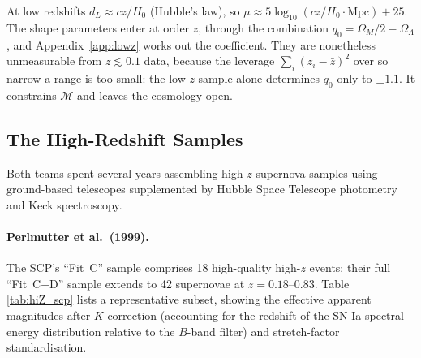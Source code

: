 \documentclass[12pt]{article}
\begin{document}
At low redshifts $d_L \approx cz/H_0$ (Hubble's law), so
$\mu \approx 5\log_{10}(cz/H_0\cdot\text{Mpc}) + 25$.  The shape parameters
enter at order $z$, through the combination $q_0 = \Omega_M/2 -
\Omega_\Lambda$, and Appendix~\ref{app:lowz} works out the coefficient.  They
are nonetheless unmeasurable from $z \lesssim 0.1$ data, because the leverage
$\sum_i(z_i-\bar z)^2$ over so narrow a range is too small: the low-$z$ sample
alone determines $q_0$ only to $\pm 1.1$.  It constrains $\mathcal{M}$ and
leaves the cosmology open.

\subsection{The High-Redshift Samples}

Both teams spent several years assembling high-$z$ supernova samples
using ground-based telescopes supplemented by Hubble Space Telescope
photometry and Keck spectroscopy.

\paragraph{Perlmutter et al.\ (1999).}  The SCP's ``Fit~C'' sample
comprises 18 high-quality high-$z$ events; their full ``Fit~C+D''
sample extends to 42 supernovae at $z = 0.18$--$0.83$.  Table
\ref{tab:hiZ_scp} lists a representative subset, showing the effective
apparent magnitudes after $K$-correction (accounting for the redshift
of the SN Ia spectral energy distribution relative to the $B$-band
filter) and stretch-factor standardisation.
\end{document}
